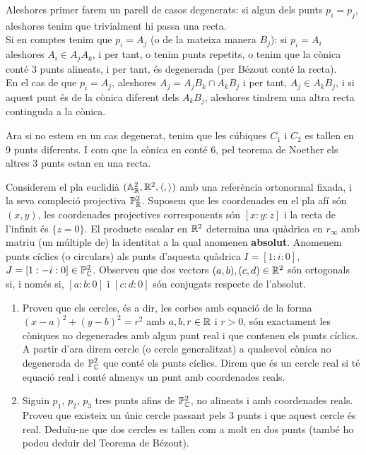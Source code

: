 \documentclass[11pt, a4paper]{article}
\begin{document}
Aleshores primer farem un parell de casos degenerats: si algun dels punts $p_i=p_j$, aleshores tenim que trivialment hi passa una recta.\\
Si en comptes tenim que $p_i=A_j$ (o de la mateixa manera $B_j$): si $p_i = A_i$ aleshores $A_i\in A_j A_k$, i per tant, o tenim punts repetits, o tenim que la cònica conté 3 punts alineats, i per tant, és degenerada (per Bézout conté la recta).\\
En el cas de que $p_i = A_j$, aleshores $A_j = A_j B_k\cap A_k B_j$ i per tant, $A_j\in A_kB_j$, i si aquest punt és de la cònica diferent dels $A_kB_j$, aleshores tindrem una altra recta continguda a la cònica.\par
Ara si no estem en un cas degenerat, tenim que les cúbiques $C_1$ i $C_2$ es tallen en 9 punts diferents. I com que la cònica en conté 6, pel teorema de Noether els altres 3 punts estan en una recta.
\newpage
\begin{tcolorbox}[title=\section{Exercici 2}]
    Considerem el pla euclidià $(\mathbb{A}^2_\mathbb R,\mathbb R^2,\langle,\rangle)$
    amb una referència ortonormal fixada, i la seva compleció projectiva $\mathbb P^2_\mathbb R$. Suposem que les coordenades en el pla afí són $(x, y)$, les coordenades projectives corresponents són $[x : y : z]$ i la recta de l'infinit és $\{z = 0\}$. El producte escalar en $\mathbb R^2$ determina una quàdrica en $r_\infty$ amb matriu (un múltiple de) la identitat a la qual anomenen \textbf{absolut}. Anomenem punts cíclics (o circulars) als punts d'aquesta quàdrica $I = [1 : i : 0]$, $J = [1 : -i : 0]\in \mathbb P^2_\mathbb C$. Observeu que dos vectors $(a, b),(c, d) \in \mathbb R^2$ són ortogonals si, i només si, $[a : b : 0]$ i $[c : d : 0]$ són conjugats respecte de l'absolut.
    \begin{enumerate}
        \item Proveu que els cercles, és a dir, les corbes amb equació de la forma $(x-a)^2+(y-b)^2=r^2$ amb $a, b, r \in \mathbb R$ i $r > 0$, són exactament les còniques no degenerades amb algun punt real i que contenen els punts cíclics. A partir d'ara direm cercle (o cercle generalitzat) a qualsevol cònica no degenerada de $\mathbb P^2_\mathbb C$ que conté els punts cíclics. Direm que és un cercle real si té equació real i conté almenys un punt amb coordenades reals.
        \item Siguin $p_1$, $p_2$, $p_3$ tres punts afins de $\mathbb P^2_\mathbb C$, no alineats i amb coordenades reals. Proveu que existeix un únic cercle passant pels 3 punts i que aquest cercle és real. Deduïu-ne que dos cercles es tallen com a molt en dos punts (també ho podeu deduir del Teorema de Bézout).
    \end{enumerate}
\end{tcolorbox}
\end{document}

